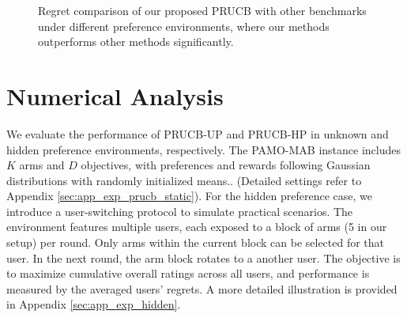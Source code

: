 \begin{figure}[t]
\begin{center}
    \caption{Regret comparison of our proposed PRUCB with other benchmarks under different preference environments, where our methods outperforms other methods significantly.}
\label{fig: exp1_sample}
\end{center}
\end{figure}




\section{Numerical Analysis}
We evaluate the performance of PRUCB-UP and PRUCB-HP in unknown and hidden preference environments, respectively. The PAMO-MAB instance includes 
$K$ arms and $D$ objectives, with preferences and rewards following Gaussian distributions with randomly initialized means..
(Detailed settings refer to Appendix \ref{sec:app_exp_prucb_static}). 
For the hidden preference case, we introduce a user-switching protocol to simulate practical scenarios. The environment features multiple users, each exposed to a block of arms (5 in our setup) per round. Only arms within the current block can be selected for that user. In the next round, the arm block rotates to a another user. The objective is to maximize cumulative overall ratings across all users, and performance is measured by the averaged users' regrets. A more detailed illustration is provided in Appendix \ref{sec:app_exp_hidden}.

